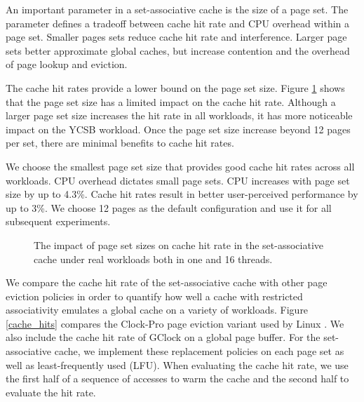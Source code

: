 
An important parameter in a set-associative cache is the size of a page set.
The parameter defines a tradeoff between cache hit rate and
CPU overhead within a page set.   Smaller pages sets reduce cache hit
rate and interference.  Larger page sets better approximate global caches, but 
increase contention and the overhead of page lookup and eviction.

The cache hit rates provide a lower bound on the page set size.
Figure \ref{hit_ratio} shows that the page set size has a limited impact on
the cache hit rate. 
Although a larger page set size increases the hit rate in all workloads, it
has more noticeable impact on the YCSB workload.  
Once the page set size increase beyond 12 pages per set, there are minimal 
benefits to cache hit rates.

We choose the smallest page set size that provides good cache hit rates 
across all workloads.  CPU overhead dictates small page sets.
CPU increases with page set size by up to 4.3\%.  Cache hit rates
result in better user-perceived performance by up to 3\%.
We choose 12 pages as the default configuration and use it for all subsequent experiments.

\begin{figure}[tb]
\begin{center}
\vspace{-15pt}

\vspace{-15pt}
\caption{The impact of page set sizes on cache hit rate in the set-associative cache
under real workloads both in one and 16 threads.}
\label{hit_ratio}
\end{center}
\end{figure}


We compare the cache hit rate of the set-associative cache with other page eviction
policies in order to quantify how well a cache with restricted associativity
emulates a global cache \cite{Sen02} on a variety of workloads.  
Figure \ref{cache_hits} compares the Clock-Pro page eviction
variant used by Linux \cite{clockpro}.
We also include the cache hit rate of GClock \cite{gclock} on a global
page buffer.   For the set-associative cache, we implement these replacement
policies on each page set as well as least-frequently used (LFU).
When evaluating the cache
hit rate, we use the first half of a sequence of accesses to warm the cache
and the second half to evaluate the hit rate.

